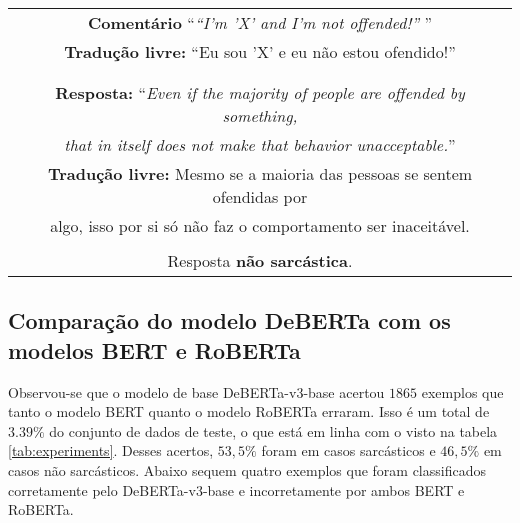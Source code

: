 \begin{center}
\begin{tabular}{|c|}

\hline

\textbf{Comentário} ``\textit{``I'm 'X' and I'm not offended!''} '' \\

\textbf{Tradução livre:} ``Eu sou 'X' e eu não estou ofendido!'' \\ \\

\hline

\\

\textbf{Resposta:} ``\textit{Even if the majority of people are offended by something,} \\
\textit{that in itself does not make that behavior unacceptable.}'' \\

\textbf{Tradução livre:} Mesmo se a maioria das pessoas se sentem ofendidas por \\
algo, isso por si só não faz o comportamento ser inaceitável. \\ \\

Resposta \textbf{não sarcástica}.

\\ \hline

\end{tabular}
\end{center}

\subsection{Comparação do modelo DeBERTa com os modelos BERT e RoBERTa}%
\label{sub:comparacao_do_modelo_deberta_com_os_modelos_bert_e_roberta}

Observou-se que o modelo de base DeBERTa-v3-base acertou $1865$ exemplos que
tanto o modelo BERT quanto o modelo RoBERTa erraram. Isso é um total de $3.39\%$
do conjunto de dados de teste, o que está em linha com o visto na tabela
\ref{tab:experiments}. Desses acertos, $53,5\%$ foram em casos sarcásticos e
$46,5\%$ em casos não sarcásticos. Abaixo sequem quatro exemplos que foram
classificados corretamente pelo DeBERTa-v3-base e incorretamente por ambos BERT
e RoBERTa. \jump

